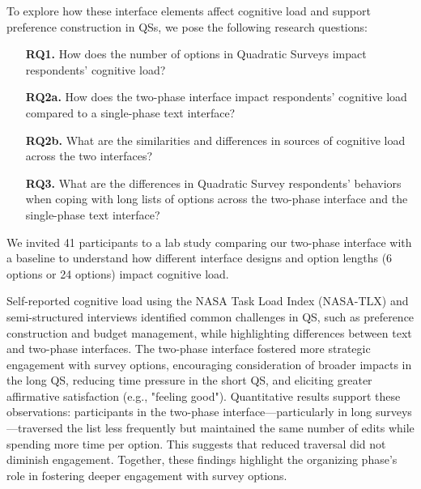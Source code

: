 To explore how these interface elements affect cognitive load and support preference construction in QSs, we pose the following research questions:
\begin{itemize}
    \item [\textbf{RQ1.}] How does the number of options in Quadratic Surveys impact respondents' cognitive load?
    \item [\textbf{RQ2a.}] How does the two-phase interface impact respondents' cognitive load compared to a single-phase text interface?
    \item [\textbf{RQ2b.}] What are the similarities and differences in sources of cognitive load across the two interfaces?
    \item [\textbf{RQ3.}] What are the differences in Quadratic Survey respondents' behaviors when coping with long lists of options across the two-phase interface and the single-phase text interface?
\end{itemize}


We invited 41 participants to a lab study comparing our two-phase interface with a baseline to understand how different interface designs and option lengths (6 options or 24 options) impact cognitive load. 

Self-reported cognitive load using the NASA Task Load Index (NASA-TLX) and semi-structured interviews identified common challenges in QS, such as preference construction and budget management, while highlighting differences between text and two-phase interfaces. The two-phase interface fostered more strategic engagement with survey options, encouraging consideration of broader impacts in the long QS, reducing time pressure in the short QS, and eliciting greater affirmative satisfaction (e.g., "feeling good"). Quantitative results support these observations: participants in the two-phase interface—particularly in long surveys—traversed the list less frequently but maintained the same number of edits while spending more time per option. This suggests that reduced traversal did not diminish engagement. Together, these findings highlight the organizing phase's role in fostering deeper engagement with survey options.



